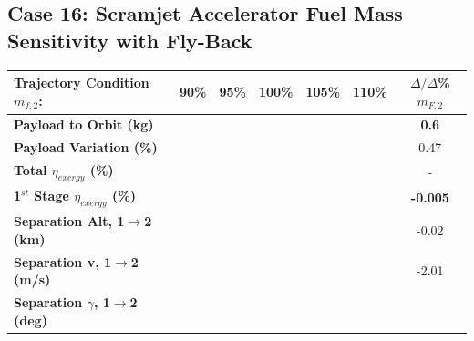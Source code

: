 \subsection{Case 16: Scramjet Accelerator Fuel Mass Sensitivity with Fly-Back}

\begin{table}[ht]%
	\centering
\begin{tabular}{l c c c c c c} 
	\hline \textbf{Trajectory Condition}   \qquad  $m_{f,2}$:
	&90\%
	&95\%
	&100\%
	&105\%
	&110\%
	& $\Delta/\Delta$\%$m_{F,2}$
	\\
	\hline \textbf{Payload to Orbit (kg)}
	& \textbf{\PayloadToOrbitmFuelNinety}
	& \textbf{\PayloadToOrbitmFuelNinetyFive}
	& \textbf{\PayloadToOrbitmFuelStandard}
	& \textbf{\PayloadToOrbitmFuelOneHundredFive}
	& \textbf{\PayloadToOrbitmFuelOneHundredTen}
	&\textbf{0.6}
	\\
	\textbf{Payload Variation (\%)}
	& \PayloadVarmFuelNinety
	& \PayloadVarmFuelNinetyFive
	& \PayloadVarmFuelStandard
	& \PayloadVarmFuelOneHundredFive
	& \PayloadVarmFuelOneHundredTen
	&0.47
	\\
	\textbf{Total $\eta_{exergy}$ (\%)}
	& \textbf{\totalExergyEffmFuelNinety}
	& \textbf{\totalExergyEffmFuelNinetyFive}
	& \textbf{\totalExergyEffmFuelStandard}
	& \textbf{\totalExergyEffmFuelOneHundredFive}
	& \textbf{\totalExergyEffmFuelOneHundredTen}
	& -
	\\
	\hline 
	\textbf{1$^{st}$ Stage $\eta_{exergy}$ (\%)}
	& \textbf{\firstExergyEffmFuelNinety}
	& \textbf{\firstExergyEffmFuelNinetyFive}
	& \textbf{\firstExergyEffmFuelStandard}
	& \textbf{\firstExergyEffmFuelOneHundredFive}
	& \textbf{\firstExergyEffmFuelOneHundredTen}
	& \textbf{-0.005}
	\\
	\textbf{Separation Alt, 1$\rightarrow$2 (km)}
	& \firstsecondSeparationAltmFuelNinety
	& \firstsecondSeparationAltmFuelNinetyFive
	& \firstsecondSeparationAltmFuelStandard
	& \firstsecondSeparationAltmFuelOneHundredFive
	& \firstsecondSeparationAltmFuelOneHundredTen
	&-0.02
	\\
	\textbf{Separation v, 1$\rightarrow$2 (m/s)}
	& \firstsecondSeparationvmFuelNinety
	& \firstsecondSeparationvmFuelNinetyFive
	& \firstsecondSeparationvmFuelStandard
	& \firstsecondSeparationvmFuelOneHundredFive
	& \firstsecondSeparationvmFuelOneHundredTen
	&-2.01
	\\
	\textbf{Separation $\gamma$, 1$\rightarrow$2 (deg)}
	& \firstsecondSeparationgammamFuelNinety
	& \firstsecondSeparationgammamFuelNinetyFive
	& \firstsecondSeparationgammamFuelStandard

\end{tabular}
\end{table}
